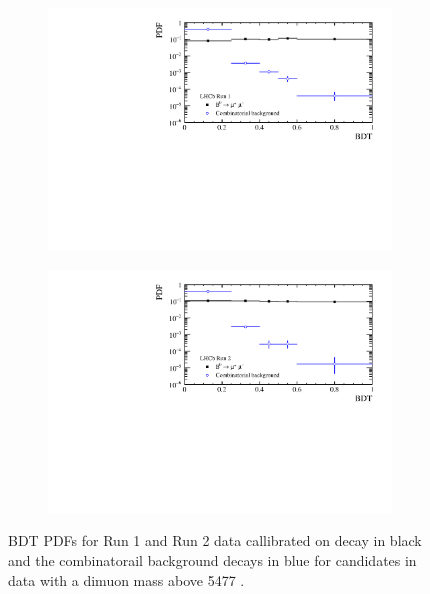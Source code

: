 \begin{figure}[htbp]
    \centering
   \begin{subfigure}[b]{0.4\textwidth}
        \includegraphics[width= 0.8 \textwidth]{./Figs/BFAnalysis/Bd2KPi_BDTCalibration_RunI.pdf}
    \end{subfigure}
    \begin{subfigure}[b]{0.4\textwidth}
       \includegraphics[width=\textwidth]{./Figs/BFAnalysis/Bd2KPi_BDTCalibration_RunII.pdf}
   \end{subfigure}
    \caption{\bmumu BDT PDFs for Run 1 and Run 2 data callibrated on \bdkpi decay in black and the combinatorail background decays in blue for \bmumu candidates in data with a dimuon mass above 5477 \mevcc. }
    \label{fig:BDTPDFs}
\end{figure}



